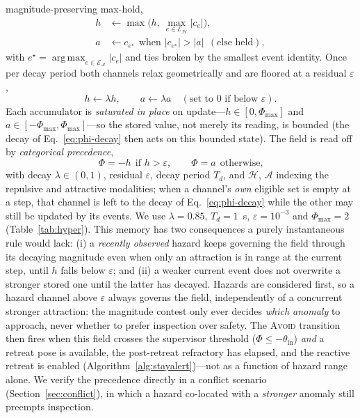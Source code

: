 magnitude-preserving max-hold,
\begin{align}
\label{eq:phi-chan}
h &\leftarrow \max\!\big(h,\ \textstyle\max_{e\in\mathcal{E}_{\mathcal{H}}}|c_e|\big),\\
a &\leftarrow c_{e^\star}\ \ \text{when } |c_{e^\star}|>|a|\ \ (\text{else held}),
\end{align}
with $e^\star=\operatorname*{arg\,max}_{e\in\mathcal{E}_{\mathcal{A}}}|c_e|$ and
ties broken by the smallest event identity. Once per decay period both channels
relax geometrically and are floored at a residual $\varepsilon$,
\begin{equation}
\label{eq:phi-decay}
h\leftarrow\lambda h,\qquad a\leftarrow\lambda a\quad(\text{set to }0\text{ if below }\varepsilon).
\end{equation}
Each accumulator is \emph{saturated in place} on update---$h\in[0,\Phi_{\max}]$
and $a\in[-\Phi_{\max},\Phi_{\max}]$---so the stored value, not merely its
reading, is bounded (the decay of Eq.~\eqref{eq:phi-decay} then acts on this
bounded state). The field is read off by \emph{categorical precedence},
\begin{equation}
\label{eq:phi-update}
\Phi=-h\ \ \text{if } h>\varepsilon,\qquad
\Phi=a\ \ \text{otherwise,}
\end{equation}
with decay $\lambda\in(0,1)$, residual $\varepsilon$, decay period $T_d$, and
$\mathcal{H}$, $\mathcal{A}$ indexing the repulsive and attractive modalities; when
a channel's \emph{own} eligible set is empty at a step, that channel is left to the
decay of Eq.~\eqref{eq:phi-decay} while the other may still be updated by its
events. We use $\lambda=0.85$, $T_d=1$~s,
$\varepsilon=10^{-3}$ and $\Phi_{\max}=2$ (Table~\ref{tab:hyper}). This memory has two consequences a purely
instantaneous rule would lack: (i) a \emph{recently observed} hazard keeps
governing the field through its decaying magnitude even when only an attraction is
in range at the current step, until $h$ falls below $\varepsilon$; and (ii) a
weaker current event does not overwrite a stronger stored one until the latter has
decayed. Hazards are considered first, so a hazard channel above $\varepsilon$
always governs the field, independently of a concurrent stronger attraction: the
magnitude contest only ever decides \emph{which anomaly} to approach, never
whether to prefer inspection over safety. The \textsc{Avoid} transition then fires
when this field crosses the supervisor threshold ($\Phi\le-\theta_{\text{in}}$)
\emph{and} a retreat pose is available, the post-retreat refractory has elapsed,
and the reactive retreat is enabled (Algorithm~\ref{alg:stayalert})---not as a
function of hazard range alone. We verify the precedence directly in a conflict
scenario (Section~\ref{sec:conflict}), in which a hazard co-located with a
\emph{stronger} anomaly still preempts inspection.

